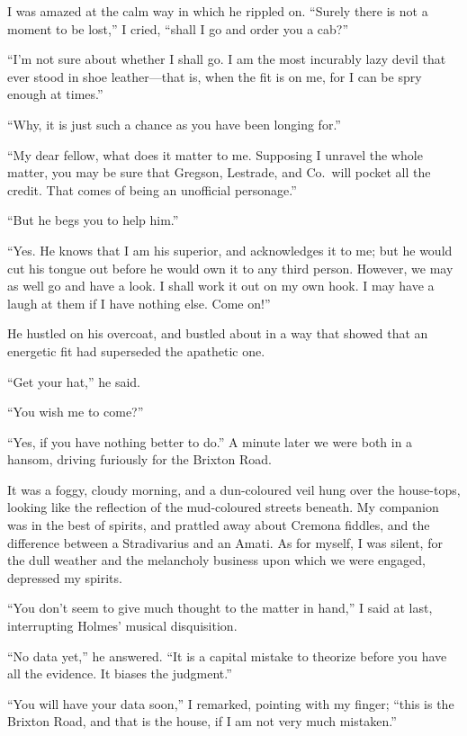 \documentclass[12pt,english,oneside]{book}
\newcommand{\mdsh}[1]{\mbox{#1}\linebreak[1]}
\begin{document}
I was amazed at the calm way in which he rippled on. {}``Surely there
is not a moment to be lost,'' I cried, {}``shall I go and order
you a cab?''

{}``I'm not sure about whether I shall go. I am the most incurably
lazy devil that ever stood in shoe leather\mdsh{---}that is, when
the fit is on me, for I can be spry enough at times.''

{}``Why, it is just such a chance as you have been longing for.''

{}``My dear fellow, what does it matter to me. Supposing I unravel
the whole matter, you may be sure that Gregson, Lestrade, and Co.\ will
pocket all the credit. That comes of being an unofficial personage.''

{}``But he begs you to help him.''

{}``Yes. He knows that I am his superior, and acknowledges it to
me; but he would cut his tongue out before he would own it to any
third person. However, we may as well go and have a look. I shall
work it out on my own hook. I may have a laugh at them if I have nothing
else. Come on!''

He hustled on his overcoat, and bustled about in a way that showed
that an energetic fit had superseded the apathetic one.

{}``Get your hat,'' he said.

{}``You wish me to come?''

{}``Yes, if you have nothing better to do.'' A minute later we were
both in a hansom, driving furiously for the Brixton Road.

It was a foggy, cloudy morning, and a dun-coloured veil hung over
the house-tops, looking like the reflection of the mud-coloured streets
beneath. My companion was in the best of spirits, and prattled away
about Cremona fiddles, and the difference between a Stradivarius and
an Amati. As for myself, I was silent, for the dull weather and the
melancholy business upon which we were engaged, depressed my spirits.

{}``You don't seem to give much thought to the matter in hand,''
I said at last, interrupting Holmes' musical disquisition.

{}``No data yet,'' he answered. {}``It is a capital mistake to
theorize before you have all the evidence. It biases the judgment.''

{}``You will have your data soon,'' I remarked, pointing with my
finger; {}``this is the Brixton Road, and that is the house, if I
am not very much mistaken.''
\end{document}
